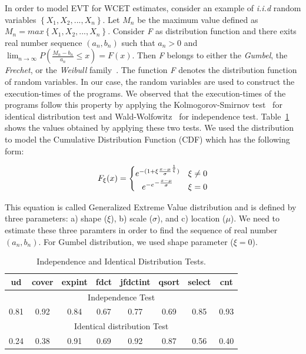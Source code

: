 In order to model  EVT for WCET estimates, consider an example of \textit{i.i.d} random variables $\left \{ X_1,X_2,...,X_n \right \}$. Let $M_n$  be the maximum value defined as $M_n = max \left \{ X_1,X_2,...,X_n \right \}$. Consider \textit{F} as distribution function and there exits real number sequence $(a_n,b_n)$ such that $a_n > 0$ and $\lim_{n \to \infty}  P (\frac{M_n-b_n}{a_n}\leq x) = F(x)$. Then \textit{F} belongs to either the \textit{Gumbel}, the \textit{Frechet}, or the \textit{Weibull} family~\cite{gnedenko1943distribution}. The function \textit{F} denotes the distribution function of random variables. In our case, the random variables are used to construct the execution-times of the programs. We observed that the execution-times of the programs follow this property by applying the Kolmogorov-Smirnov test~\cite{KS-test} for identical distribution test and Wald-Wolfowitz~\cite{gumbel1954statistical} for independence test. Table~\ref{iid-2-test} shows the values obtained by applying these two tests. We used the distribution to model the Cumulative Distribution Function (CDF) which has the following form:


$$F_\xi (x) = \left\{\begin{matrix}
e^{-(1+\xi \frac{x-\mu}{\sigma }^\frac{1}{\xi})}& \xi \neq 0\\ 
   
    e^{-e}\strut^{-\frac{x-\mu}{\sigma}}
                                  & \xi = 0 
\end{matrix}\right.$$


This equation is called Generalized Extreme Value distribution and is defined by three parameters:
a) shape ($\xi$), b) scale ($\sigma$), and c) location ($\mu$). We need to estimate these three paramters in order to find the sequence of real number $(a_n,b_n)$.
For Gumbel distribution, we used shape parameter ($\xi=0$).
\begin{table}
\center
\caption{Independence and Identical Distribution Tests.}

\label{iid-2-test}

\begin{tabular}{|c | c| c | c| c| c |c |c |} 
 \hline
ud & cover & expint & fdct &jfdctint&qsort&select&cnt  \\ 


\hline

 
 
 \multicolumn{8}{c}{Independence Test} \\
 \hline 

 
 0.81 & 0.92  & 0.84 & 0.67&0.77 &0.69 &0.85 &0.93   \\
 \hline
 \multicolumn{8}{c}{Identical distribution Test} \\
 \hline
 0.24&0.38  &0.91 &0.69&0.92 &0.87 &0.56 &0.40   \\
 \hline
 
 
\end{tabular}
\end{table}

